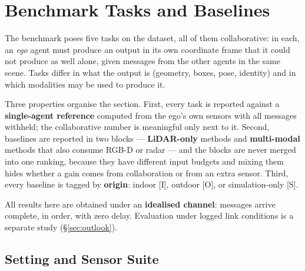 
\section{Benchmark Tasks and Baselines}
\label{sec:benchmarks}

The benchmark poses five tasks on the dataset, all of them collaborative: in
each, an \emph{ego} agent must produce an output in its own coordinate frame
that it could not produce as well alone, given messages from the other agents
in the same scene. Tasks differ in what the output is (geometry, boxes, pose,
identity) and in which modalities may be used to produce it.

Three properties organise the section. First, every task is reported against a
\textbf{single-agent reference} computed from the ego's own sensors with all
messages withheld; the collaborative number is meaningful only next to it.
Second, baselines are reported in two blocks --- \textbf{LiDAR-only} methods
and \textbf{multi-modal} methods that also consume RGB-D or radar --- and the
blocks are never merged into one ranking, because they have different input
budgets and mixing them hides whether a gain comes from collaboration or from
an extra sensor. Third, every baseline is tagged by \textbf{origin}: indoor
[I], outdoor [O], or simulation-only [S].

All results here are obtained under an \textbf{idealised channel}: messages
arrive complete, in order, with zero delay. Evaluation under logged link
conditions is a separate study (\S\ref{sec:outlook}).

\subsection{Setting and Sensor Suite}
\label{sec:bench:setting}

